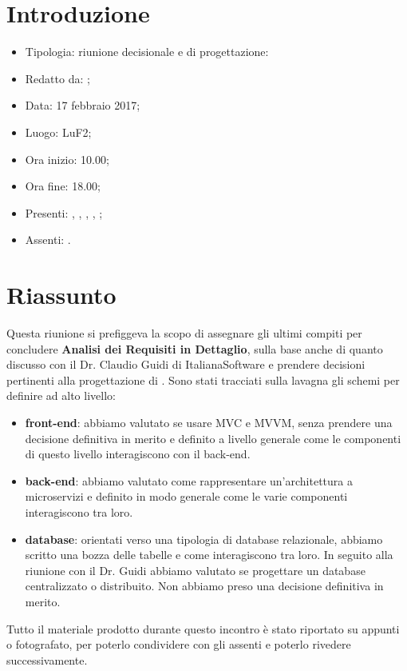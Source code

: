 \section{Introduzione}

	\begin{itemize}
		\item Tipologia: riunione decisionale e di progettazione:
		\item Redatto da: \NS;
		\item Data: 17 febbraio 2017;
		\item Luogo: LuF2;
		\item Ora inizio: 10.00;
		\item Ora fine: 18.00;
		\item Presenti: \AN, \DAN, \DS, \MC, \NS;
		\item Assenti: \AS.
	\end{itemize}

\section{Riassunto}
Questa riunione si prefiggeva la scopo di assegnare gli ultimi compiti per concludere \textbf{Analisi dei Requisiti in Dettaglio}, sulla base anche di quanto discusso con il Dr. Claudio Guidi di ItalianaSoftware e prendere decisioni pertinenti alla progettazione di \progetto. 
Sono stati tracciati sulla lavagna gli schemi per definire ad alto livello:
\begin{itemize}
	\item \textbf{front-end}: abbiamo valutato se usare MVC e MVVM, senza prendere una decisione definitiva in merito e definito a livello generale come le componenti di questo livello interagiscono con il back-end. 
	\item \textbf{back-end}: abbiamo valutato come rappresentare un'architettura a microservizi e definito in modo generale come le varie componenti interagiscono tra loro. 
	\item \textbf{database}: orientati verso una tipologia di database relazionale, abbiamo scritto una bozza delle tabelle e come interagiscono tra loro. In seguito alla riunione con il Dr. Guidi abbiamo valutato se progettare un database centralizzato o distribuito. Non abbiamo preso una decisione definitiva in merito.
\end{itemize}
Tutto il materiale prodotto durante questo incontro è stato riportato su appunti o fotografato, per poterlo condividere con gli assenti e poterlo rivedere successivamente.